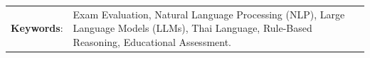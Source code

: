 \begin{table} [H]
  \begin{tabular}{p{1.5cm} p{13cm}}
  \setlength{\parindent}{-1.2ex} \textbf{Keywords}: & Exam Evaluation, Natural Language Processing (NLP), Large Language Models (LLMs), Thai Language, Rule-Based Reasoning, Educational Assessment.\\
  \end{tabular}
\end{table}
